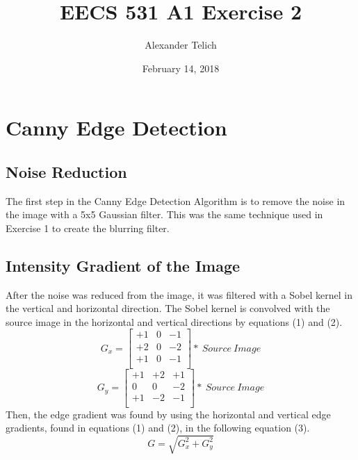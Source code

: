 \documentclass[11pt]{article}
\author{Alexander Telich}
\title{EECS 531 A1 Exercise 2}
\date{February 14, 2018}
\begin{document}
    \maketitle
    \section{Canny Edge Detection}\label{sec:exercise1}
    \subsection{Noise Reduction}\label{subsec:1.NoiseReduction}
    \setlength\parindent{24pt}
    The first step in the Canny Edge Detection Algorithm is to remove the noise in the image
    with a 5x5 Gaussian filter.
    This was the same technique used in Exercise 1 to create the blurring filter.
    \subsection{Intensity Gradient of the Image}\label{subsec:2.IntensityGradientOfTheImage}
    \setlength\parindent{24pt}
    After the noise was reduced from the image, it was filtered with a Sobel kernel in
    the vertical and horizontal direction.
    The Sobel kernel is convolved with the source image in the horizontal and vertical
    directions by equations (1) and (2).
    \begin{equation}
        G_x=\left[\begin{matrix}+1&0&-1\\+2&0&-2\\+1&0&-1\\\end{matrix}\right]\ast\ Source\ Image
    \end{equation}
    \newline
    \begin{equation}
        G_y=\left[\begin{matrix}+1&+2&+1\\0&0&-2\\+1&-2&-1\\\end{matrix}\right]\ast\ Source\ Image
    \end{equation}
    \newline
    Then, the edge gradient was found by using the horizontal and vertical edge gradients,
    found in equations (1) and (2), in the following equation (3).
    \begin{equation}
        G=\sqrt{G_x^2+G_y^2}
    \end{equation}
\end{document}
